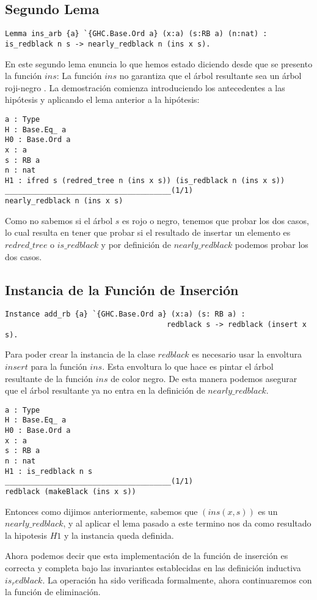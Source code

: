 \documentclass[letterpaper,12pt,oneside]{book}
\newcommand{\arn}{árbol roji-negro }
\theoremstyle{plain}
\theoremstyle{definition}
\theoremstyle{remark}
\begin{document}
\subsection{Segundo Lema}
\begin{verbatim}
Lemma ins_arb {a} `{GHC.Base.Ord a} (x:a) (s:RB a) (n:nat) : 
is_redblack n s -> nearly_redblack n (ins x s).
\end{verbatim}
En este segundo lema enuncia lo que hemos estado diciendo desde que se presento la funci\'on $ins$: La funci\'on $ins$ no garantiza que el \'arbol 
resultante sea un \arn. La demostraci\'on comienza introduciendo los antecedentes a las hipótesis y aplicando el lema anterior a la hip\'otesis:
\begin{verbatim}
a : Type
H : Base.Eq_ a
H0 : Base.Ord a
x : a
s : RB a
n : nat
H1 : ifred s (redred_tree n (ins x s)) (is_redblack n (ins x s))
______________________________________(1/1)
nearly_redblack n (ins x s)
\end{verbatim}
Como no sabemos si el \'arbol $s$ es rojo o negro, tenemos que probar los dos casos, lo cual resulta en tener que probar si el resultado de insertar un elemento
es $redred\_tree$ o $is\_redblack$ y por definici\'on  de $nearly\_redblack$ podemos probar los dos casos.
\subsection{Instancia de la Funci\'on de Inserci\'on}
\begin{verbatim}
Instance add_rb {a} `{GHC.Base.Ord a} (x:a) (s: RB a) :
                                     redblack s -> redblack (insert x s).
\end{verbatim}
Para poder crear la instancia de la clase $redblack$ es necesario usar la envoltura $insert$ para la funci\'on $ins$. Esta envoltura lo que hace es pintar el \'arbol resultante de la funci\'on $ins$ de color negro. De esta manera podemos asegurar que el \'arbol resultante ya no entra en la definici\'on de $nearly\_redblack$.
\begin{verbatim}
a : Type
H : Base.Eq_ a
H0 : Base.Ord a
x : a
s : RB a
n : nat
H1 : is_redblack n s
______________________________________(1/1)
redblack (makeBlack (ins x s))
\end{verbatim}
Entonces como dijimos anteriormente, sabemos que $(ins(x,s))$ es un $nearly\_redblack$, y al aplicar el lema pasado a este termino nos da como resultado la hipotesis $H1$ y la instancia queda definida.

Ahora podemos decir que esta implementaci\'on de la funci\'on de inserci\'on es correcta y completa bajo las invariantes establecidas en las definici\'on inductiva $is_redblack$. La operaci\'on ha sido verificada formalmente, ahora continuaremos con la funci\'on de eliminaci\'on.  
\end{document}
